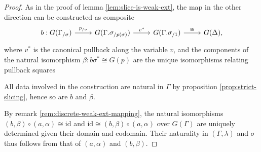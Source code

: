 \documentclass[a4paper]{article}
\theoremstyle{remark}
\theoremstyle{definition}
\begin{document}
\begin{proof}
  As in the proof of lemma \ref{lem:slice-is-weak-ext}, the map in the other direction can be constructed as composite
  \begin{equation}
    \begin{tikzcd}
      b : G(\Gamma_{/ \sigma}) \arrow[r, "p_{/ \sigma}"] & G(\Gamma.\sigma_{/ p(\sigma)}) \arrow[r, "v^*"] & G(\Gamma.\sigma_{/ 1}) \arrow[r, "\cong"] & G(\Delta),
    \end{tikzcd}
  \end{equation}
  where $v^*$ is the canonical pullback along the variable $v$, and the components of the natural isomorphism $\beta : b \sigma^* \cong G(p)$ are the unique isomorphisms relating pullback squares
  All data involved in the construction are natural in $\Gamma$ by proposition \ref{prop:strict-slicing}, hence so are $b$ and $\beta$.

  By remark \ref{rem:discrete-weak-ext-mapping}, the natural isomorphisms $(b, \beta) \circ (a, \alpha) \cong \mathrm{id}$ and $\mathrm{id} \cong (b, \beta) \circ (a, \alpha)$ over $G(\Gamma)$ are uniquely determined given their domain and codomain.
  Their naturality in $(\Gamma, \lambda)$ and $\sigma$ thus follows from that of $(a, \alpha)$ and $(b, \beta)$.
\end{proof}
\end{document}
